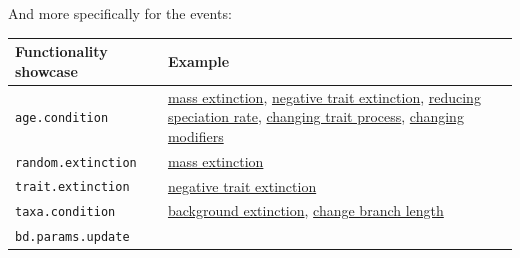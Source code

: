 \documentclass[
]{book}
\begin{document}
And more specifically for the events:

\begin{longtable}[]{@{}ll@{}}
\toprule
\begin{minipage}[b]{0.55\columnwidth}\raggedright
Functionality showcase\strut
\end{minipage} & \begin{minipage}[b]{0.39\columnwidth}\raggedright
Example\strut
\end{minipage}\tabularnewline
\midrule
\endhead
\begin{minipage}[t]{0.55\columnwidth}\raggedright
\texttt{age.condition}\strut
\end{minipage} & \begin{minipage}[t]{0.39\columnwidth}\raggedright
\protect\hyperlink{EGrandom_ext}{mass extinction}, \protect\hyperlink{EGneg_ext}{negative trait extinction}, \protect\hyperlink{EGred_spec}{reducing speciation rate}, \protect\hyperlink{EG_change_trait}{changing trait process}, \protect\hyperlink{EG_change_modif}{changing modifiers}\strut
\end{minipage}\tabularnewline
\begin{minipage}[t]{0.55\columnwidth}\raggedright
\texttt{random.extinction}\strut
\end{minipage} & \begin{minipage}[t]{0.39\columnwidth}\raggedright
\protect\hyperlink{EGrandom_ext}{mass extinction}\strut
\end{minipage}\tabularnewline
\begin{minipage}[t]{0.55\columnwidth}\raggedright
\texttt{trait.extinction}\strut
\end{minipage} & \begin{minipage}[t]{0.39\columnwidth}\raggedright
\protect\hyperlink{EGneg_ext}{negative trait extinction}\strut
\end{minipage}\tabularnewline
\begin{minipage}[t]{0.55\columnwidth}\raggedright
\texttt{taxa.condition}\strut
\end{minipage} & \begin{minipage}[t]{0.39\columnwidth}\raggedright
\protect\hyperlink{EGbg_ext}{background extinction}, \protect\hyperlink{EG_modify_brlen}{change branch length}\strut
\end{minipage}\tabularnewline
\begin{minipage}[t]{0.55\columnwidth}\raggedright
\texttt{bd.params.update}\strut
\end{minipage} & \begin{minipage}[t]{0.39\columnwidth}\raggedright

\end{minipage}
\end{longtable}
\end{document}
